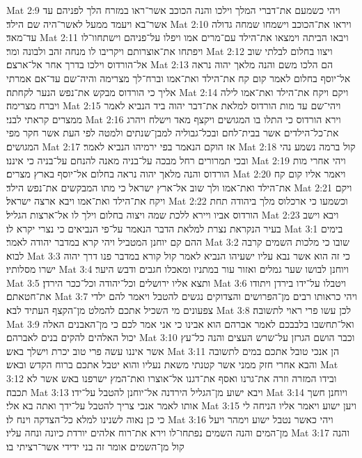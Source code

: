 Mat 2:9  ויהי כשמעם את־דברי המלך וילכו והנה הכוכב אשר־ראו במזרח הלך לפניהם עד אשר־בא ויעמד ממעל לאשר־היה שם הילד׃
Mat 2:10  ויראו את־הכוכב וישמחו שמחה גדולה עד־מאד׃
Mat 2:11  ויבאו הביתה וימצאו את־הילד עם־מרים אמו ויפלו על־פניהם וישתחוו־לו ויפתחו את־אוצרותם ויקריבו לו מנחה זהב ולבונה ומר׃
Mat 2:12  ויצוו בחלום לבלתי שוב אל־הורדוס וילכו בדרך אחר אל־ארצם׃
Mat 2:13  הם הלכו משם והנה מלאך יהוה נראה אל־יוסף בחלום לאמר קום קח את־הילד ואת־אמו וברח־לך מצרימה והיה־שם עד־אם אמרתי אליך כי הורדוס מבקש את־נפש הנער לקחתה׃
Mat 2:14  ויקם ויקח את־הילד ואת־אמו לילה ויברח מצרימה׃
Mat 2:15  ויהי־שם עד מות הורדוס למלאת את־דבר יהוה ביד הנביא לאמר ממצרים קראתי לבני׃
Mat 2:16  וירא הורדוס כי התלו בו המגושים ויקצף מאד וישלח ויהרג את־כל־הילדים אשר בבית־לחם ובכל־גבוליה למבן־שנתים ולמטה לפי העת אשר חקר מפי המגושים׃
Mat 2:17  אז הוקם הנאמר בפי ירמיהו הנביא לאמר׃
Mat 2:18  קול ברמה נשמע נהי ובכי תמרורים רחל מבכה על־בניה מאנה להנחם על־בניה כי איננו׃
Mat 2:19  ויהי אחרי מות הורדוס והנה מלאך יהוה נראה בחלום אל־יוסף בארץ מצרים׃
Mat 2:20  ויאמר אליו קום קח את־הילד ואת־אמו ולך שוב אל־ארץ ישראל כי מתו המבקשים את־נפש הילד׃
Mat 2:21  ויקם ויקח את־הילד ואת־אמו ויבא ארצה ישראל׃
Mat 2:22  וכשמעו כי ארכלוס מלך ביהודה תחת הורדוס אביו ויירא ללכת שמה ויצוה בחלום וילך לו אל־ארצות הגליל׃
Mat 2:23  ויבא וישב בעיר הנקראת נצרת למלאת הדבר הנאמר על־פי הנביאים כי נצרי יקרא לו׃
Mat 3:1  בימים ההם קם יוחנן המטביל ויהי קרא במדבר יהודה לאמר׃
Mat 3:2  שובו כי מלכות השמים קרבה לבוא׃
Mat 3:3  כי זה הוא אשר נבא עליו ישעיהו הנביא לאמר קול קורא במדבר פנו דרך יהוה ישרו מסלותיו׃
Mat 3:4  ויוחנן לבושו שער גמלים ואזור עור במתניו ומאכלו חגבים ודבש היער׃
Mat 3:5  ותצא אליו ירושלים וכל־יהודה וכל־ככר הירדן׃
Mat 3:6  ויטבלו על־ידו בירדן ויתודו את־חטאתם׃
Mat 3:7  ויהי כראותו רבים מן־הפרושים והצדוקים נגשים להטבל ויאמר להם ילדי צפעונים מי השכיל אתכם להמלט מן־הקצף העתיד לבא׃
Mat 3:8  לכן עשו פרי ראוי לתשובה׃
Mat 3:9  ואל־תחשבו בלבבכם לאמר אברהם הוא אבינו כי אני אמר לכם כי מן־האבנים האלה יכול האלהים להקים בנים לאברהם׃
Mat 3:10  וכבר הושם הגרזן על־שרש העצים והנה כל־עץ אשר איננו עשה פרי טוב יכרת וישלך באש׃
Mat 3:11  הן אנכי טובל אתכם במים לתשובה והבא אחרי חזק ממני אשר קטנתי משאת נעליו והוא יטבל אתכם ברוח הקדש ובאש׃
Mat 3:12  ובידו המזרה וזרה את־גרנו ואסף את־דגנו אל־אוצרו ואת־המץ ישרפנו באש אשר לא תכבה׃
Mat 3:13  ויבא ישוע מן־הגליל הירדנה אל־יוחנן להטבל על־ידו׃
Mat 3:14  ויוחנן חשך אותו לאמר אנכי צריך להטבל על־ידך ואתה בא אלי׃
Mat 3:15  ויען ישוע ויאמר אליו הניחה לי כי כן נאוה לשנינו למלא כל־הצדקה וינח לו׃
Mat 3:16  ויהי כאשר נטבל ישוע וימהר ויעל מן־המים והנה השמים נפתחו־לו וירא את־רוח אלהים יורדת כיונה ונחה עליו׃
Mat 3:17  והנה קול מן־השמים אומר זה בני ידידי אשר־רציתי בו׃
